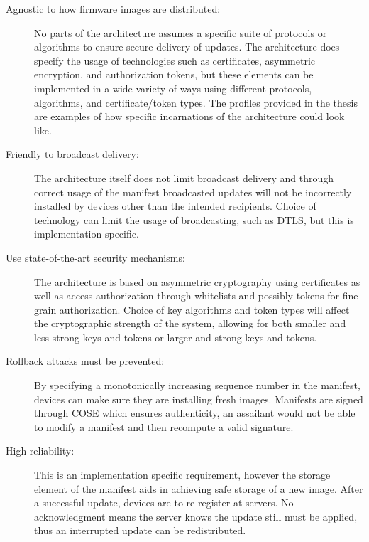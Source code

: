 \documentclass[0-thesis.tex]{subfiles}
\begin{document}
\begin{description}
    \item[Agnostic to how firmware images are distributed:]
        No parts of the architecture assumes a specific suite of protocols or algorithms
        to ensure secure delivery of updates. The architecture does specify the usage of
        technologies such as certificates, asymmetric encryption, and authorization
        tokens, but these elements can be implemented in a wide variety of ways using
        different protocols, algorithms, and certificate/token types. The profiles
        provided in the thesis are examples of how specific incarnations of the
        architecture could look like.

    \item[Friendly to broadcast delivery:]
        The architecture itself does not limit broadcast delivery and through correct
        usage of the manifest broadcasted updates will not be incorrectly installed by
        devices other than the intended recipients. Choice of technology can limit the
        usage of broadcasting, such as DTLS, but this is implementation specific.

    \item[Use state-of-the-art security mechanisms:]
        The architecture is based on asymmetric cryptography using certificates as well as
        access authorization through whitelists and possibly tokens for fine-grain
        authorization. Choice of key algorithms and token types will affect the
        cryptographic strength of the system, allowing for both smaller and less strong
        keys and tokens or larger and strong keys and tokens. 

    \item[Rollback attacks must be prevented:]
        By specifying a monotonically increasing sequence number in the manifest, devices
        can make sure they are installing fresh images. Manifests are signed through COSE
        which ensures authenticity, an assailant would not be able to modify a manifest
        and then recompute a valid signature.

    \item[High reliability:]
        This is an implementation specific requirement, however the storage element of the
        manifest aids in achieving safe storage of a new image. After a successful update,
        devices are to re-register at servers. No acknowledgment means the server knows
        the update still must be applied, thus an interrupted update can be redistributed.


\end{description}
\end{document}
